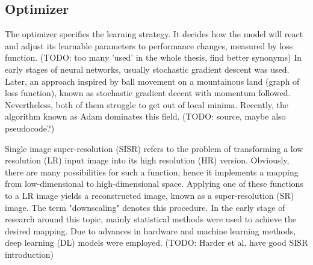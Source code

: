 \subsection{Optimizer}

The optimizer specifies the learning strategy. 
It decides how the model will react and adjust its learnable parameters to performance changes, measured by loss function.
(TODO: too many 'used' in the whole thesis, find better synonyms)
In early stages of neural networks, usually stochastic gradient descent was used.
Later, an approach inspired by ball movement on a mountainous land (graph of loss function), known as stochastic gradient decent with momentum followed.
Nevertheless, both of them struggle to get out of local minima.
Recently, the algorithm known as Adam dominates this field. (TODO: source, maybe also pseudocode?)


Single image super-resolution (SISR) refers to the problem of transforming a low resolution (LR) input image into its high resolution (HR) version.
Obviously, there are many possibilities for such a function; hence it implements a mapping from low-dimensional to high-dimensional space.
Applying one of these functions to a LR image yields a reconstructed image, known as a super-resolution (SR) image.
The term "downscaling" denotes this procedure.
In the early stage of research around this topic, mainly statistical methods were used to achieve the desired mapping. 
Due to advances in hardware and machine learning methods, deep learning (DL) models were employed. (TODO: Harder et al. have good SISR introduction)



